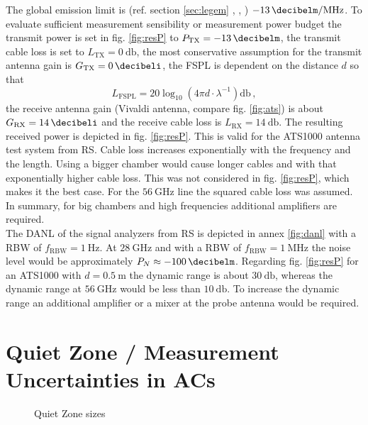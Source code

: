 The global emission limit is (ref. section \ref{sec:legem} \cite{ceptercrec}, \cite{ansi}, \cite{fcc}) $\SI{-13}{\decibelm\per\mega\hertz}$. To evaluate sufficient measurement sensibility or measurement power budget the transmit power is set in fig. \ref{fig:resP} to $P_{\text{TX}}=\SI{-13}{\decibelm}$, the transmit cable loss is set to $L_{\text{TX}} = \SI{0}{\decibel}$, the most conservative assumption for the transmit antenna gain is $ G_{\text{TX}} = \SI{0}{\decibeli}$, the \ac{FSPL} is dependent on the distance $d$ so that 
\begin{equation}
L_{\text{FSPL}} = 20\log_{10}\left(4\pi d \cdot\lambda^{-1}\right)\si{\decibel}\,,
\label{eq:fspl}
\end{equation}
the receive antenna gain (Vivaldi antenna, compare fig. \ref{fig:ats}) is about $ G_{\text{RX}} = \SI{14}{\decibeli}$ and the receive cable loss is $L_{\text{RX}}=\SI{14}{\decibel}$. The resulting received power is depicted in fig. \ref{fig:resP}. This is valid for the ATS1000 antenna test system from \ac{RS}. Cable loss increases exponentially with the frequency and the length. Using a bigger chamber would cause longer cables and with that exponentially higher cable loss. This was not considered in fig. \ref{fig:resP}, which makes it the best case. For the $\SI{56}{\giga\hertz}$ line the squared cable loss was assumed. In summary, for big chambers and high frequencies additional amplifiers are required.\\
The \ac{DANL} of the signal analyzers from \ac{RS} is depicted in annex \ref{fig:danl} with a \ac{RBW} of $f_{\text{RBW}}=\SI{1}{\hertz}$. At $\SI{28}{\giga\hertz}$ and with a \ac{RBW} of $f_{\text{RBW}}=\SI{1}{\mega\hertz}$ the noise level would be approximately $P_N \approx \SI{-100}{\decibelm}$. Regarding fig. \ref{fig:resP} for an ATS1000 with $d=\SI{0.5}{\meter}$ the dynamic range is about $\SI{30}{\decibel}$, whereas the dynamic range at $\SI{56}{\giga\hertz}$ would be less than $\SI{10}{\decibel}$. To increase the dynamic range an additional amplifier or a mixer at the probe antenna would be required.

\section{Quiet Zone / Measurement Uncertainties in ACs}

\begin{figure}[h]
  \centering
  \centering
\caption{Quiet Zone sizes}
\label{fig:qz}
\end{figure}

